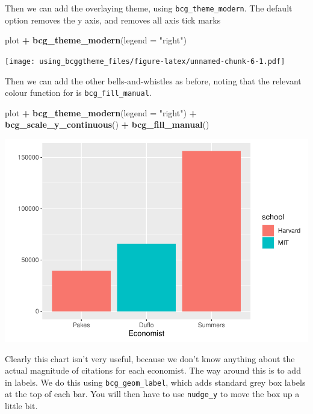 \documentclass[
]{article}
\newenvironment{Shaded}{\begin{snugshade}}{\end{snugshade}}
\newcommand{\DataTypeTok}[1]{\textcolor[rgb]{0.13,0.29,0.53}{#1}}
\newcommand{\KeywordTok}[1]{\textcolor[rgb]{0.13,0.29,0.53}{\textbf{#1}}}
\newcommand{\NormalTok}[1]{#1}
\newcommand{\OperatorTok}[1]{\textcolor[rgb]{0.81,0.36,0.00}{\textbf{#1}}}
\newcommand{\StringTok}[1]{\textcolor[rgb]{0.31,0.60,0.02}{#1}}
\begin{document}
Then we can add the overlaying theme, using \texttt{bcg\_theme\_modern}.
The default option removes the y axis, and removes all axis tick marks

\begin{Shaded}
\begin{Highlighting}[]
\NormalTok{plot }\OperatorTok{+}
\StringTok{  }\KeywordTok{bcg_theme_modern}\NormalTok{(}\DataTypeTok{legend =} \StringTok{"right"}\NormalTok{)}
\end{Highlighting}
\end{Shaded}

\texttt{[image: using\_bcggtheme\_files/figure-latex/unnamed-chunk-6-1.pdf]}

Then we can add the other bells-and-whistles as before, noting that the
relevant colour function for is \texttt{bcg\_fill\_manual}.

\begin{Shaded}
\begin{Highlighting}[]
\NormalTok{plot }\OperatorTok{+}
\StringTok{  }\KeywordTok{bcg_theme_modern}\NormalTok{(}\DataTypeTok{legend =} \StringTok{"right"}\NormalTok{) }\OperatorTok{+}
\StringTok{  }\KeywordTok{bcg_scale_y_continuous}\NormalTok{() }\OperatorTok{+}
\StringTok{  }\KeywordTok{bcg_fill_manual}\NormalTok{()}
\end{Highlighting}
\end{Shaded}

\includegraphics{using_bcggtheme_files/figure-latex/unnamed-chunk-7-1.pdf}

Clearly this chart isn't very useful, because we don't know anything
about the actual magnitude of citations for each economist. The way
around this is to add in labels. We do this using
\texttt{bcg\_geom\_label}, which adds standard grey box labels at the
top of each bar. You will then have to use \texttt{nudge\_y} to move the
box up a little bit.
\end{document}
